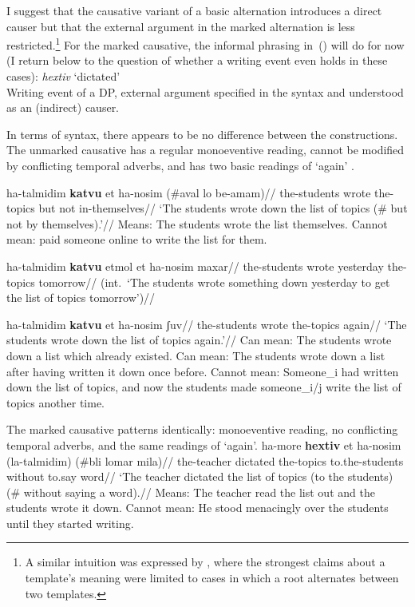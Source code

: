 I suggest that the causative variant of a basic alternation introduces a direct causer \citep{bittner99,kratzer05} but that the external argument in the marked alternation is less restricted.\footnote{A similar intuition was expressed by \cite{doron03}, where the strongest claims about a template's meaning were limited to cases in which a root alternates between two templates.} For the marked causative, the informal phrasing in~(\nextx) will do for now (I return below to the question of whether a writing event even holds in these cases):
\ex \emph{hextiv} `dictated'\\
	Writing event of a DP, external argument specified in the syntax and understood as an (indirect) causer.
\xe

In terms of syntax, there appears to be no difference between the constructions. The unmarked causative has a regular monoeventive reading, cannot be modified by conflicting temporal adverbs, and has two basic readings of `again' \citep{vonstechow96}.

\pex  \begingl
		\gla ha-talmidim \textbf{katvu} et ha-nosim (\#aval lo be-a{\ts}mam)//
		\glb the-students wrote  the-topics but not in-themselves//
		\glft `The students wrote down the list of topics (\# but not by themselves).'//
		\endgl
	\a Means: The students wrote the list themselves.
	\a Cannot mean: paid someone online to write the list for them.
\xe

\ex \ljudge{*} \begingl
		\gla ha-talmidim \textbf{katvu} etmol et ha-nosim maxar//
		\glb the-students wrote yesterday  the-topics tomorrow//
		\glft (int.~`The students wrote something down yesterday to get the list of topics tomorrow')//
		\endgl
\xe

\pex \begingl
		\gla ha-talmidim \textbf{katvu} et ha-nosim ʃuv//
		\glb the-students wrote  the-topics again//
		\glft `The students wrote down the list of topics again.'//
		\endgl
	\a Can mean: The students wrote down a list which already existed.
	\a Can mean: The students wrote down a list after having written it down once before.
	\a Cannot mean: Someone_{i} had written down the list of topics, and now the students made someone_{i/j} write the list of topics another time.
\xe

The marked causative patterns identically: monoeventive reading, no conflicting temporal adverbs, and the same readings of `again'.
\pex
	\a \begingl
		\gla ha-more \textbf{hextiv} et ha-nosim (la-talmidim) (\#bli lomar mila)//
		\glb the-teacher dictated  the-topics to.the-students without to.say word//
		\glft `The teacher dictated the list of topics (to the students) (\# without saying a word).//
	\endgl
	\a Means: The teacher read the list out and the students wrote it down.
	\a Cannot mean: He stood menacingly over the students until they started writing.
\xe

